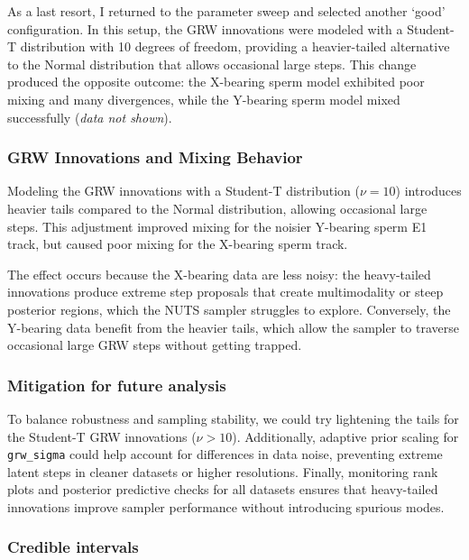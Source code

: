\documentclass[
  10pt,
  a4paper,
  openany]{scrbook}
\begin{document}
As a last resort, I returned to the parameter sweep and selected another
`good' configuration. In this setup, the GRW innovations were modeled
with a Student-T distribution with 10 degrees of freedom, providing a
heavier-tailed alternative to the Normal distribution that allows
occasional large steps. This change produced the opposite outcome: the
X-bearing sperm model exhibited poor mixing and many divergences, while
the Y-bearing sperm model mixed successfully (\emph{data not shown}).

\subsubsection{GRW Innovations and Mixing
Behavior}\label{grw-innovations-and-mixing-behavior}

Modeling the GRW innovations with a Student-T distribution (\(\nu=10\))
introduces heavier tails compared to the Normal distribution, allowing
occasional large steps. This adjustment improved mixing for the noisier
Y-bearing sperm E1 track, but caused poor mixing for the X-bearing sperm
track.

The effect occurs because the X-bearing data are less noisy: the
heavy-tailed innovations produce extreme step proposals that create
multimodality or steep posterior regions, which the NUTS sampler
struggles to explore. Conversely, the Y-bearing data benefit from the
heavier tails, which allow the sampler to traverse occasional large GRW
steps without getting trapped.

\subsubsection{Mitigation for future
analysis}\label{mitigation-for-future-analysis}

To balance robustness and sampling stability, we could try lightening
the tails for the Student-T GRW innovations (\(\nu > 10\)).
Additionally, adaptive prior scaling for \texttt{grw\_sigma} could help
account for differences in data noise, preventing extreme latent steps
in cleaner datasets or higher resolutions. Finally, monitoring rank
plots and posterior predictive checks for all datasets ensures that
heavy-tailed innovations improve sampler performance without introducing
spurious modes.

\subsubsection{Credible intervals}\label{credible-intervals}
\end{document}
